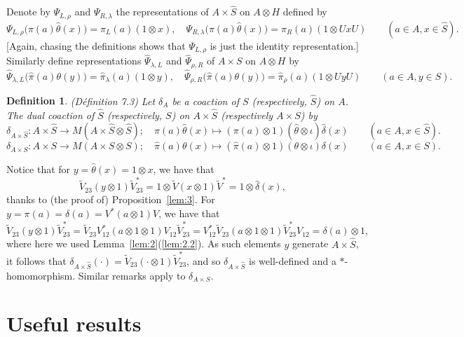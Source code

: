 \documentclass[a4paper,12pt]{article}
\theoremstyle{plain}
\newtheorem{definition}[proposition]{Definition}
\theoremstyle{definition}
\begin{document}
Denote by $\Psi_{L,\rho}$ and $\Psi_{R,\lambda}$ the representations of
$A\times\hat S$ on $A\otimes H$ defined by
\[ \Psi_{L,\rho}\big( \pi(a)\hat\theta(x) \big)
= \pi_L(a)(1\otimes x), \quad
\Psi_{R,\lambda}\big( \pi(a)\hat\theta(x) \big)
= \pi_R(a)(1\otimes UxU)
\qquad (a\in A, x\in\hat S). \]
[Again, chasing the definitions shows that $\Psi_{L,\rho}$ is just the
identity representation.]
Similarly define representations $\hat\Psi_{\lambda,L}$ and
$\hat\Psi_{\rho,R}$ of $A\times S$ on $A\otimes H$ by
\[ \hat\Psi_{\lambda,L}\big( \hat\pi(a) \theta(y) \big)
= \hat\pi_\lambda(a)(1\otimes y), \quad
\hat\Psi_{\rho,R}\big( \hat\pi(a) \theta(y) \big)
= \hat\pi_\rho(a)(1\otimes UyU)
\qquad (a\in A, y\in S). \]

\begin{definition}(D\'efinition 7.3)
Let $\delta_A$ be a coaction of $S$ (respectively, $\hat S$) on $A$.
The \emph{dual coaction} of $\hat S$ (respectively, $S$) on $A\times \hat S$
(respectively $A\times S$) by
\[ \delta_{A\times\hat S}:A\times\hat S \rightarrow
   M(A\times\hat S\otimes\hat S); \quad
   \pi(a)\hat\theta(x) \mapsto (\pi(a)\otimes 1)
   (\hat\theta\otimes\iota)\hat\delta(x)
\qquad (a\in A, x\in\hat S). \]
\[ \delta_{A\times S}:A\times S \rightarrow
   M(A\times S\otimes S); \quad
   \hat\pi(a)\theta(x) \mapsto (\hat\pi(a)\otimes 1)
   (\theta\otimes\iota)\delta(x)
\qquad (a\in A, x\in S). \]
\end{definition}

Notice that for $y=\hat\theta(x) = 1\otimes x$, we have that
\[ \tilde V_{23}(y\otimes 1)\tilde V_{23}^* 
= 1 \otimes \tilde V(x\otimes 1)\tilde V^*
= 1\otimes\hat\delta(x), \]
thanks to (the proof of) Proposition~\ref{lem:3}.  For $y=\pi(a) =\delta(a)
= V^*(a\otimes 1)V$, we have that
\[ \tilde V_{23}(y\otimes 1)\tilde V_{23}^*
= \tilde V_{23}V_{12}^*(a\otimes 1\otimes 1)V_{12}\tilde V_{23}^*
= V_{12}^* \tilde V_{23}(a\otimes 1\otimes 1)\tilde V_{23}^*V_{12}
= \delta(a)\otimes 1, \]
where here we used Lemma~\ref{lem:2}(\ref{lem:2.2}).  As such elements $y$
generate $A\times \hat S$, it follows that $\delta_{A\times\hat S}(\cdot)
= \tilde V_{23}(\cdot\otimes 1)\tilde V_{23}^*$, and so
$\delta_{A\times\hat S}$ is well-defined and a $*$-homomorphism.
Similar remarks apply to $\delta_{A\times S}$.





\appendix
\section{Useful results}
\end{document}
